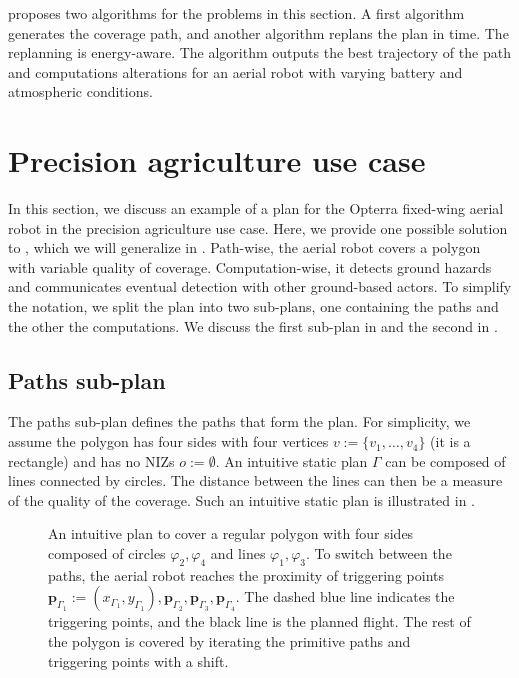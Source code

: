  proposes two algorithms for the problems in this section. A first algorithm generates the coverage path, and another algorithm replans the plan in time. The replanning is energy-aware. The algorithm outputs the best trajectory of the path and computations alterations for an aerial robot with varying battery and atmospheric conditions. 


\section{Precision agriculture use case}
\label{sec:flight-plan}

In this section, we discuss an example of a plan for the Opterra fixed-wing aerial robot in the precision agriculture use case. Here, we provide one possible solution to , which we will generalize in . Path-wise, the aerial robot covers a polygon with variable quality of coverage. Computation-wise, it detects ground hazards and communicates eventual detection with other ground-based actors. To simplify the notation, we split the plan into two sub-plans, one containing the paths and the other the computations. We discuss the first sub-plan in  and the second in .

\subsection{Paths sub-plan}
\label{sec:path-wise}

The paths sub-plan defines the paths that form the plan. For simplicity, we assume the polygon has four sides with four vertices $v:=\{v_1,\dots,v_4\}$ (it is a rectangle) and has no NIZs $o:=\emptyset$. An intuitive static plan $\Gamma$ can be composed of lines connected by circles. The distance between the lines can then be a measure of the quality of the coverage. Such an intuitive static plan is illustrated in .

\begin{figure}[ht!]
  \centering
  
  \caption[Boustrophedon-like motion to cover a regular polygon with four sides]{An intuitive plan to cover a regular polygon with four sides composed of circles $\varphi_2,\varphi_4$ and lines $\varphi_1,\varphi_3$. To switch between the paths, the aerial robot reaches the proximity of triggering points $\mathbf{p}_{\Gamma_1}:=(x_{\Gamma_1},y_{\Gamma_1}),\mathbf{p}_{\Gamma_2},\mathbf{p}_{\Gamma_3},\mathbf{p}_{\Gamma_4}$. The dashed blue line indicates the triggering points, and the black line is the planned flight. The rest of the polygon is covered by iterating the primitive paths and triggering points with a shift.}
  \label{fig:bm-like_pb}
\end{figure}

